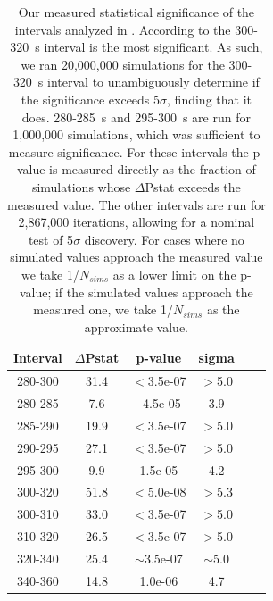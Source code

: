 \documentclass{aastex61}
\begin{document}
\begin{table}
\centering
\begin{tabular}{|c|c|c|c|c|c|}
\hline
Interval & $\Delta$Pstat & p-value & sigma \\
\hline
280-300 & 31.4 & $<$3.5e-07 & $>$5.0\\
280-285 & 7.6 & ~4.5e-05 & 3.9\\
285-290 & 19.9 & $<$3.5e-07 & $>$5.0\\
290-295 & 27.1 & $<$3.5e-07 & $>$5.0\\
295-300 & 9.9 & 1.5e-05 & 4.2\\
300-320 & 51.8 & $<$5.0e-08 & $>$5.3\\
300-310 & 33.0 & $<$3.5e-07 & $>$5.0\\
310-320 & 26.5 & $<$3.5e-07 & $>$5.0\\
320-340 & 25.4 & $\sim$3.5e-07 & $\sim$5.0\\
340-360 & 14.8 & 1.0e-06 & 4.7\\
\hline
\end{tabular}
\caption{Our measured statistical significance of the intervals analyzed in \citet{ravasio2024mega}. According to \citet{ravasio2024mega} the 300-320~s interval is the most significant. As such, we ran 20,000,000 simulations for the 300-320~s interval to unambiguously determine if the significance exceeds 5$\sigma$, finding that it does. 280-285~s and 295-300~s are run for 1,000,000 simulations, which was sufficient to measure significance. For these intervals the p-value is measured directly as the fraction of simulations whose $\Delta$Pstat exceeds the measured value. The other intervals are run for 2,867,000 iterations, allowing for a nominal test of 5$\sigma$ discovery. For cases where no simulated values approach the measured value we take 1/$N_{sims}$ as a lower limit on the p-value; if the simulated values approach the measured one, we take 1/$N_{sims}$ as the approximate value.}\label{tab:results}
\end{table}
\end{document}

